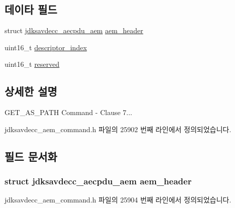 \subsection*{데이타 필드}
\begin{DoxyCompactItemize}
\item 
struct \hyperlink{structjdksavdecc__aecpdu__aem}{jdksavdecc\+\_\+aecpdu\+\_\+aem} \hyperlink{structjdksavdecc__aem__command__get__as__path_ae1e77ccb75ff5021ad923221eab38294}{aem\+\_\+header}
\item 
uint16\+\_\+t \hyperlink{structjdksavdecc__aem__command__get__as__path_a042bbc76d835b82d27c1932431ee38d4}{descriptor\+\_\+index}
\item 
uint16\+\_\+t \hyperlink{structjdksavdecc__aem__command__get__as__path_a5a6ed8c04a3db86066924b1a1bf4dad3}{reserved}
\end{DoxyCompactItemize}


\subsection{상세한 설명}
G\+E\+T\+\_\+\+A\+S\+\_\+\+P\+A\+TH Command -\/ Clause 7... 

jdksavdecc\+\_\+aem\+\_\+command.\+h 파일의 25902 번째 라인에서 정의되었습니다.



\subsection{필드 문서화}
\subsubsection[{\texorpdfstring{aem\+\_\+header}{aem_header}}]{\setlength{\rightskip}{0pt plus 5cm}struct {\bf jdksavdecc\+\_\+aecpdu\+\_\+aem} aem\+\_\+header}\hypertarget{structjdksavdecc__aem__command__get__as__path_ae1e77ccb75ff5021ad923221eab38294}{}\label{structjdksavdecc__aem__command__get__as__path_ae1e77ccb75ff5021ad923221eab38294}


jdksavdecc\+\_\+aem\+\_\+command.\+h 파일의 25904 번째 라인에서 정의되었습니다.

